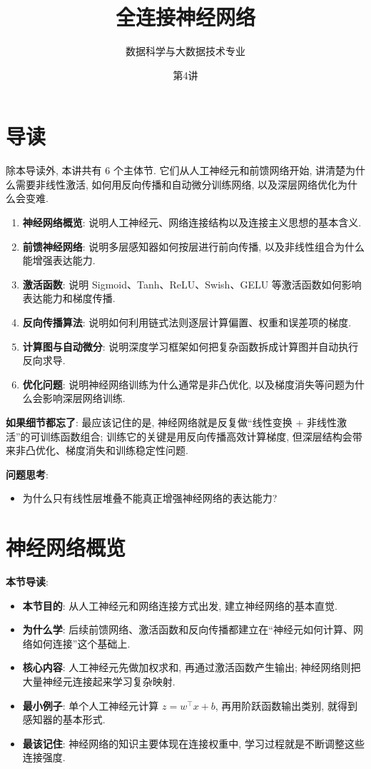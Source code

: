 \documentclass{../nndlcourse}
\begin{document}
\title{全连接神经网络 }
\author{数据科学与大数据技术专业}
\date{第4讲  }
\maketitle
\section{导读}

除本导读外, 本讲共有 6 个主体节. 它们从人工神经元和前馈网络开始, 讲清楚为什么需要非线性激活, 如何用反向传播和自动微分训练网络, 以及深层网络优化为什么会变难.

\begin{enumerate}
    \item \textbf{神经网络概览}: 说明人工神经元、网络连接结构以及连接主义思想的基本含义.
    \item \textbf{前馈神经网络}: 说明多层感知器如何按层进行前向传播, 以及非线性组合为什么能增强表达能力.
    \item \textbf{激活函数}: 说明 Sigmoid、Tanh、ReLU、Swish、GELU 等激活函数如何影响表达能力和梯度传播.
    \item \textbf{反向传播算法}: 说明如何利用链式法则逐层计算偏置、权重和误差项的梯度.
    \item \textbf{计算图与自动微分}: 说明深度学习框架如何把复杂函数拆成计算图并自动执行反向求导.
    \item \textbf{优化问题}: 说明神经网络训练为什么通常是非凸优化, 以及梯度消失等问题为什么会影响深层网络训练.
\end{enumerate}

\textbf{如果细节都忘了}: 最应该记住的是, 神经网络就是反复做“线性变换 + 非线性激活”的可训练函数组合; 训练它的关键是用反向传播高效计算梯度, 但深层结构会带来非凸优化、梯度消失和训练稳定性问题.

\textbf{问题思考}:
\begin{itemize}
    \item 为什么只有线性层堆叠不能真正增强神经网络的表达能力?
\end{itemize}

\section{神经网络概览}

\textbf{本节导读}:
\begin{itemize}
    \item \textbf{本节目的}: 从人工神经元和网络连接方式出发, 建立神经网络的基本直觉.
    \item \textbf{为什么学}: 后续前馈网络、激活函数和反向传播都建立在“神经元如何计算、网络如何连接”这个基础上.
    \item \textbf{核心内容}: 人工神经元先做加权求和, 再通过激活函数产生输出; 神经网络则把大量神经元连接起来学习复杂映射.
    \item \textbf{最小例子}: 单个人工神经元计算 $z=w^\top x+b$, 再用阶跃函数输出类别, 就得到感知器的基本形式.
    \item \textbf{最该记住}: 神经网络的知识主要体现在连接权重中, 学习过程就是不断调整这些连接强度.
\end{itemize}
\end{document}
